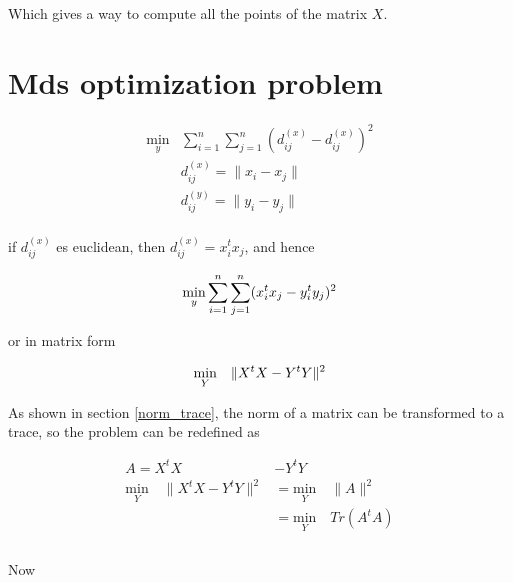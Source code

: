 \documentclass[12pt,journal]{IEEEtran}
\begin{document}
    Which gives a way to compute all the points of the matrix $X$.

    \section{Mds optimization problem}

    \begin{equation*}
        \begin{aligned}
            \underset{y}{\text{min}}  & \sum_{i=1}^n \sum_{j=1}^n ( d^{(x)}_{ij} - d^{(x)}_{ij} )^2 \\
            & d_{ij}^{(x)} = \lVert x_i - x_j \rVert\\
            & d_{ij}^{(y)} = \lVert y_i - y_j \rVert
        \end{aligned}
    \end{equation*}\\

    if $d_{ij}^{(x)}$ es euclidean, then $d_{ij}^{(x)} = x_i^t x_j$, and hence

    \begin{equation*}
        \underset{y}{\text{min}} \sum_{i=1}^n \sum_{j=1}^n ( x_i^t x_j - y_i^t y_j )^2 \\
    \end{equation*}

    or in matrix form

    \begin{equation*}
        \underset{Y}{\text{min}} \quad \lVert X^t X - Y^t Y \rVert^2 \\
    \end{equation*}

    As shown in section \ref{norm_trace}, the norm of a matrix can be transformed
    to a trace, so the problem can be redefined as

    \begin{equation*}
        \begin{aligned}
            A = X^tX &- Y^tY\\
            \underset{Y}{\text{min}} \quad \lVert X^t X - Y^t Y \rVert^2
            &=
            \underset{Y}{\text{min}} \quad \lVert A \rVert^2\\
            &=
            \underset{Y}{\text{min}} \quad Tr(A^tA) \\
        \end{aligned}
    \end{equation*}\\

    Now
\end{document}

